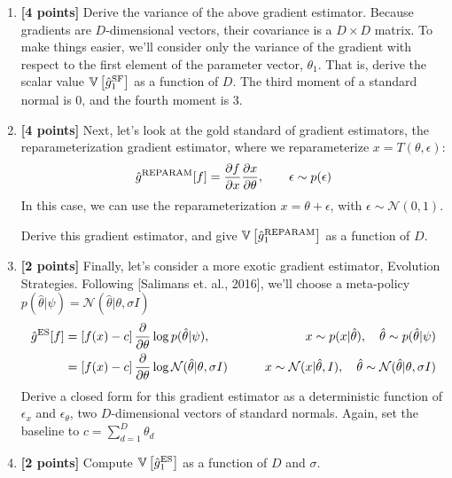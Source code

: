 \documentclass{harvardml}
\newcommand{\distNorm}{\mathcal{N}}
\newcommand{\var}{\mathbb{V}}
\newcommand{\PT}{\frac{\partial}{\partial \theta}}
\theoremstyle{plain}
\begin{document}
\begin{problem}
\begin{enumerate}[label=(\alph*)]
\item {\bf [4 points]} Derive the variance of the above gradient estimator.
Because gradients are $D$-dimensional vectors, their covariance is a $D \times D$ matrix.
To make things easier, we'll consider only the variance of the gradient with respect to the first element of the parameter vector, $\theta_1$.
That is, derive the scalar value $\var \left[ \hat g^\textnormal{SF}_1 \right]$ as a function of $D$.
The third moment of a standard normal is 0, and the fourth moment is 3.

\item {\bf [4 points]} Next, let's look at the gold standard of gradient estimators, the reparameterization gradient estimator, where we reparameterize $x = T(\theta, \epsilon)$:
%
\begin{align}
\hat g^\textnormal{REPARAM}[f] = \frac{\partial f}{\partial x} \frac{\partial x}{\partial \theta}, \qquad \epsilon \sim p(\epsilon)
\end{align}
%
In this case, we can use the reparameterization $x = \theta + \epsilon$, with $\epsilon \sim \distNorm(0, 1)$.

Derive this gradient estimator, and give $\var \left[ \hat g^\textnormal{REPARAM}_1 \right]$ as a function of $D$.

\item {\bf [2 points]} Finally, let's consider a more exotic gradient estimator, Evolution Strategies.
Following [Salimans et. al., 2016], we'll choose a meta-policy $p(\hat \theta | \psi) = \distNorm(\hat \theta |  \theta, \sigma I)$
%
\begin{align}
\hat g^\textnormal{ES}[f]
& = \left[f(x) - c\right] \PT \log p(\hat \theta | \psi), 
& \qquad x \sim p(x | \hat \theta),\quad \hat \theta \sim p(\hat \theta | \psi) \\
& = \left[f(x) - c\right] \PT \log \distNorm(\hat \theta | \theta, \sigma I)
& \qquad x \sim \distNorm(x | \hat \theta, I), \quad \hat \theta \sim \distNorm(\hat \theta | \theta, \sigma I)
\end{align}
%
Derive a closed form for this gradient estimator as a deterministic function of $\epsilon_x$ and $\epsilon_\theta$, two $D$-dimensional vectors of standard normals.
Again, set the baseline to $c = \sum_{d=1}^D \theta_d$

\item {\bf [2 points]} Compute $\var \left[ \hat g^\textnormal{ES}_1 \right]$ as a function of $D$ and $\sigma$.
\end{enumerate}
\end{problem}
\end{document}
